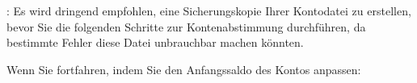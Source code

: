 \Attention{}: Es wird dringend empfohlen, eine Sicherungskopie Ihrer Kontodatei zu erstellen, bevor Sie die folgenden Schritte zur Kontenabstimmung durchführen, da bestimmte Fehler diese Datei unbrauchbar machen könnten. 

Wenn Sie fortfahren, indem Sie den Anfangssaldo des Kontos anpassen:
